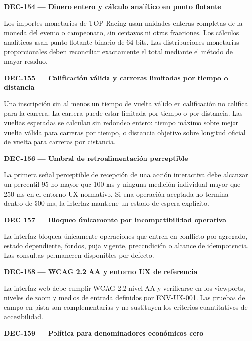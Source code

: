 \documentclass[10pt,letterpaper]{article}
\begin{document}
\noindent\textbf{DEC-154 --- Dinero entero y cálculo analítico en punto flotante}\par
Los importes monetarios de TOP Racing usan unidades enteras completas de la moneda del evento o campeonato, sin centavos ni otras fracciones. Los cálculos analíticos usan punto flotante binario de 64 bits. Las distribuciones monetarias proporcionales deben reconciliar exactamente el total mediante el método de mayor residuo.\par\vspace{0.45em}
\noindent\textbf{DEC-155 --- Calificación válida y carreras limitadas por tiempo o distancia}\par
Una inscripción sin al menos un tiempo de vuelta válido en calificación no califica para la carrera. La carrera puede estar limitada por tiempo o por distancia. Las vueltas esperadas se calculan sin redondeo entero: tiempo máximo sobre mejor vuelta válida para carreras por tiempo, o distancia objetivo sobre longitud oficial de vuelta para carreras por distancia.\par\vspace{0.45em}
\noindent\textbf{DEC-156 --- Umbral de retroalimentación perceptible}\par
La primera señal perceptible de recepción de una acción interactiva debe alcanzar un percentil 95 no mayor que 100 ms y ninguna medición individual mayor que 250 ms en el entorno UX normativo. Si una operación aceptada no termina dentro de 500 ms, la interfaz mantiene un estado de espera explícito.\par\vspace{0.45em}
\noindent\textbf{DEC-157 --- Bloqueo únicamente por incompatibilidad operativa}\par
La interfaz bloquea únicamente operaciones que entren en conflicto por agregado, estado dependiente, fondos, puja vigente, precondición o alcance de idempotencia. Las consultas permanecen disponibles por defecto.\par\vspace{0.45em}
\noindent\textbf{DEC-158 --- WCAG 2.2 AA y entorno UX de referencia}\par
La interfaz web debe cumplir WCAG 2.2 nivel AA y verificarse en los viewports, niveles de zoom y medios de entrada definidos por ENV-UX-001. Las pruebas de campo en pista son complementarias y no sustituyen los criterios cuantitativos de accesibilidad.\par\vspace{0.45em}
\noindent\textbf{DEC-159 --- Política para denominadores económicos cero}\par
\end{document}
